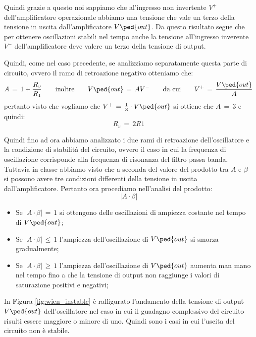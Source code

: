 Quindi grazie a questo noi sappiamo che al'ingresso non invertente $V^+$ dell'amplificatore operazionale abbiamo una tensione che vale un terzo della tensione in uscita dall'amplificatore $V\ped{out}$.
Da questo risultato segue che per ottenere oscillazioni stabili nel tempo anche la tensione all'ingresso inverente $V^-$ dell'amplificatore deve valere un terzo della tensione di output.

Quindi, come nel caso precedente, se analizziamo separatamente questa parte di circuito, ovvero il ramo di retroazione negativo otteniamo che:
\begin{equation}
	A\,=\,1 + \frac{R_v}{R_1} \qquad \text{inoltre} \qquad V\ped{out}\,=\,AV^- \qquad \text{da cui} \qquad V^+\,=\,\frac{V\ped{out}}{A}
\end{equation}
pertanto visto che vogliamo che $V^+\,=\,\frac{1}{3} \cdot V\ped{out}$ si ottiene che $A\,=\,3$ e quindi:
\begin{equation}
	R_v\,=\,2R1
\end{equation}

Quindi fino ad ora abbiamo analizzato i due rami di retroazione dell'oscillatore e la condizione di stabilità del circuito, ovvero il caso in cui la frequenza di oscillazione corrisponde alla frequenza di risonanza del filtro passa banda.
Tuttavia in classe abbiamo visto che a seconda del valore del prodotto tra $A$ e $\beta$ si possono avere tre condizioni differenti della tensione in uscita dall'amplificatore.
Pertanto ora procediamo nell'analisi del prodotto:
\begin{equation}
	\left|A \cdot \beta \right|
\end{equation}
\begin{itemize}
	\item{Se $\left|A \cdot \beta \right|\,=\,1$ si ottengono delle oscillazioni di ampiezza costante nel tempo di $V\ped{out}$;}
	\item{Se $\left|A \cdot \beta \right|\, \leq \,1$ l'ampiezza dell'oscillazione di $V\ped{out}$ si smorza gradualmente;}
	\item{Se $\left|A \cdot \beta \right|\, \geq \,1$ l'ampiezza dell'oscillazione di $V\ped{out}$ aumenta man mano nel tempo fino a che la tensione di output non raggiunge i valori di saturazione positivi e negativi;}
\end{itemize}

In Figura \ref{fig:wien_instable} è raffigurato l'andamento della tensione di output $V\ped{out}$ dell'oscillatore nel caso in cui il guadagno complessivo del circuito risulti essere maggiore o minore di uno. Quindi sono i casi in cui l'uscita del circuito non è stabile.

